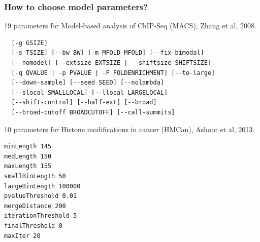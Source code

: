 \documentclass{beamer}
\begin{document}
\begin{frame}[fragile]
  \frametitle{How to choose model parameters?}
\scriptsize
19 parameters for Model-based analysis of ChIP-Seq (MACS), Zhang et al, 2008.
\begin{verbatim}
  [-g GSIZE]
  [-s TSIZE] [--bw BW] [-m MFOLD MFOLD] [--fix-bimodal]
  [--nomodel] [--extsize EXTSIZE | --shiftsize SHIFTSIZE]
  [-q QVALUE | -p PVALUE | -F FOLDENRICHMENT] [--to-large]
  [--down-sample] [--seed SEED] [--nolambda]
  [--slocal SMALLLOCAL] [--llocal LARGELOCAL]
  [--shift-control] [--half-ext] [--broad]
  [--broad-cutoff BROADCUTOFF] [--call-summits]
\end{verbatim}
10 parameters for Histone modifications in cancer (HMCan),
Ashoor et al, 2013.
\begin{verbatim}
minLength 145
medLength 150
maxLength 155
smallBinLength 50
largeBinLength 100000
pvalueThreshold 0.01
mergeDistance 200
iterationThreshold 5
finalThreshold 0
maxIter 20
\end{verbatim}
\end{frame}
\end{document}
